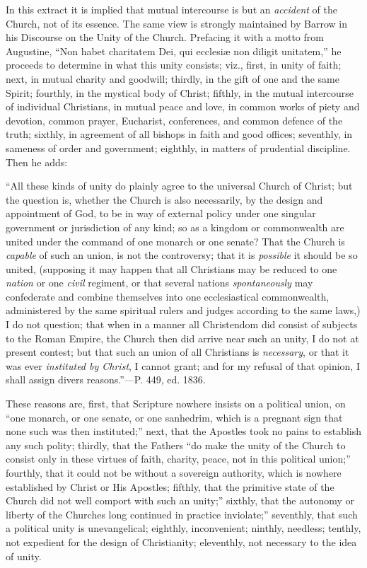 In this extract it is implied that mutual
intercourse is but an \emph{accident} of the Church, not of its
essence. The same view is strongly maintained by Barrow in his
Discourse on the Unity of the Church. Prefacing it with a motto from
Augustine, ``Non habet charitatem Dei, qui ecclesiæ non diligit
unitatem,'' he proceeds to determine in what this unity consists; viz.,
first, in unity of faith; next, in mutual charity and goodwill;
thirdly, in the gift of one and the same Spirit; fourthly, in the
mystical body of Christ; fifthly, in the mutual intercourse of
individual Christians, in mutual peace and love, in common works of
piety and devotion, common prayer, Eucharist, conferences, and common
defence of the truth; sixthly, in agreement of all bishops in faith
and good offices; seventhly, in sameness of order and government;
eighthly, in matters of prudential discipline. Then he adds:

``All these kinds of unity do plainly agree to the
universal Church of Christ; but the question is, whether the Church is
also necessarily, by the design and appointment of God, to be in way
of external policy under one singular government or jurisdiction of
any kind; so as a kingdom or commonwealth are united under the command
of one monarch or one senate? That the Church is \emph{capable} of
such an union, is not the controversy; that it is \emph{possible} it
should be so united, (supposing it may happen that all Christians may
be reduced to one \emph{nation} or one \emph{civil} regiment, or that
several nations \emph{spontaneously} may confederate and combine
themselves into one ecclesiastical commonwealth, administered by the
same spiritual rulers and judges according to the same laws,) I do not
question; that when in a manner all Christendom did consist of
subjects to the Roman Empire, the Church then did arrive near such an
unity, I do not at present contest; but that such an union of all
Christians is \emph{necessary}, or that it was ever \emph{instituted by
Christ}, I cannot grant; and for my refusal of that opinion, I
shall assign divers reasons.''—P. 449, ed. 1836.

These reasons are, first, that Scripture nowhere
insists on a political union, on ``one monarch, or one senate, or one
sanhedrim, which is a pregnant sign that none such was then
instituted;'' next, that the Apostles took no pains to establish any
such polity; thirdly, that the Fathers ``do make the unity of the
Church to consist only in these virtues of faith, charity, peace, not
in this political union;'' fourthly, that it could not be without a
sovereign authority, which is nowhere established by Christ or His
Apostles; fifthly, that the primitive state of the Church did not well
comport with such an unity;'' sixthly, that the autonomy or liberty of
the Churches long continued in practice inviolate;'' seventhly, that
such a political unity is unevangelical; eighthly, inconvenient;
ninthly, needless; tenthly, not expedient for the design of
Christianity; eleventhly, not necessary to the idea of unity.

